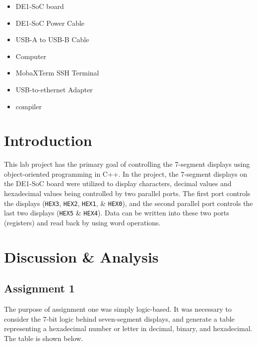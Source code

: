 \documentclass[
	letterpaper, %
	10pt, %
]{CSUniSchoolLabReport}
\begin{document}
\begin{itemize}

  \item DE1-SoC board

  \item DE1-SoC Power Cable

  \item USB-A to USB-B Cable

  \item Computer

  \item MobaXTerm SSH Terminal

  \item USB-to-ethernet Adapter

  \item {} compiler

\end{itemize}

\section{Introduction}

This lab project has the primary goal of controlling the 7-segment displays using object-oriented programming in C++. In the project, the 7-segment displays on the DE1-SoC board were utilized to display characters, decimal values and hexadecimal values being controlled by two parallel ports. The first port controls the displays (\texttt{HEX3}, \texttt{HEX2}, \texttt{HEX1}, \& \texttt{HEX0}), and the second parallel port controls the last two displays (\texttt{HEX5} \& \texttt{HEX4}). Data can be written into these two ports (registers) and read back by using word operations. 

\section{Discussion \& Analysis} 

\subsection{Assignment 1}

The purpose of assignment one was simply logic-based. It was necessary to consider the 7-bit logic behind seven-segment displays, and generate a table representing a hexadecimal number or letter in decimal, binary, and hexadecimal. The table is shown below.
\end{document}
